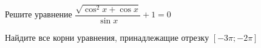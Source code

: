 \begin{ex}
	\begin{condition}
		\begin{enumcols}[label=\asbuk*)]
			\item Решите уравнение \( \dfrac{\sqrt{\cos^2 x +\cos x}}{\sin x}+1 =0 \)
			\item Найдите все корни уравнения, принадлежащие отрезку \( \left[-3\pi;-2\pi\right] \)
		\end{enumcols}
	\end{condition}
\end{ex}